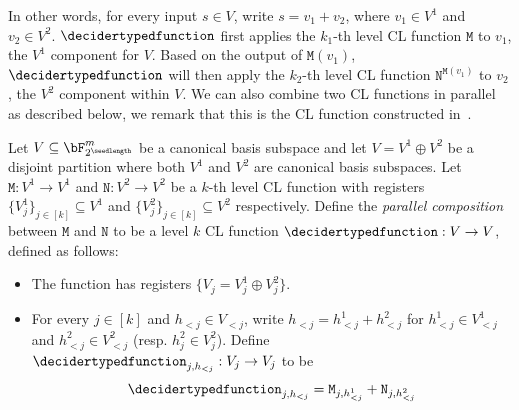 In other words,  for every input $s \in V$, write $s = v_1+v_2$, where $v_1 \in V^1$ and $v_2 \in V^2$. $\decidertypedfunction$ first applies the $k_1$-th level CL function $\mathtt{M}$ to $v_1$, the $V^1$ component for $V$. Based on the output of $\mathtt{M}(v_1)$, $\decidertypedfunction$ will then apply the $k_2$-th level CL function $\mathtt{N}^{\mathtt{M}(v_1)}$ to $v_2$, the $V^2$ component within $V$. We can also combine two CL functions in parallel as described below, we remark that this is the CL function constructed in~\cite[Lemma 4.9]{jiMIPRE2022a}.
\begin{definition} \label{defn:parallelcomposCLfn}
		Let $V \subseteq \bF_{2^{\seedlength}}^m$ be a canonical basis subspace and let $V = V^1 \oplus V^2$  be a disjoint partition where both $V^1$ and $V^2$ are canonical basis subspaces. Let $\mathtt{M}: V^1 \rightarrow V^1$ and $\mathtt{N}: V^2 \rightarrow V^2$ be a  $k$-th level CL function with registers $\{V_j^1\}_{j \in [k]} \subseteq V^1$ and  $\{V_j^2\}_{j \in [k]} \subseteq V^2$ respectively. Define the \textit{parallel composition} between $\mathtt{M}$ and $\mathtt{N}$ to be a level $k$ CL function $\decidertypedfunction: V \rightarrow V$, defined as follows:
	\begin{itemize}
		\item The function has registers $\{V_j = V_j^1 \oplus V_j^2\}$. 
		\item For every $j \in [k]$ and $h_{< j} \in V_{< j}$, write $h_{< j} = h_{< j}^1 + h_{<j}^2$ for $h_{< j}^1 \in V_{< j}^{1}$ and $h_{< j}^2 \in V_{< j}^2$ (resp. $h_j^2 \in V_j^2$). Define $\decidertypedfunction_{j, h_{< j}}: V_j \rightarrow V_j$ to be
		\begin{equation*}
			\decidertypedfunction_{j, h_{< j}} = \mathtt{M}_{j, h_{< j}^1} +  \mathtt{N}_{j, h_{< j}^2} 
		\end{equation*}
	\end{itemize}
\end{definition} 


